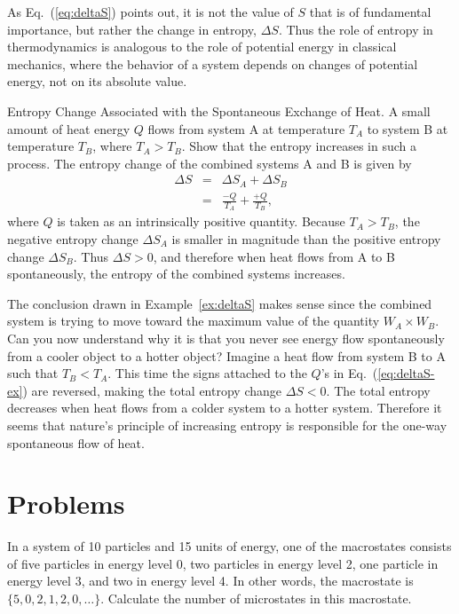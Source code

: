 As Eq.~(\ref{eq:deltaS}) points out, it is not the value of $S$ that
is of fundamental importance, but rather the change in entropy,
$\Delta S$.  Thus the role of entropy in thermodynamics is analogous
to the role of potential energy in classical mechanics, where the
behavior of a system depends on changes of potential energy, not on
its absolute value.

\begin{example}{Entropy Change Associated with the Spontaneous
    Exchange of Heat.}
\label{ex:deltaS}
A small amount of heat energy $Q$ flows from system A at temperature $T_A$
to system B at temperature $T_B$, where $T_A > T_B$.  Show that the 
entropy increases in such a process.
\solution
The entropy change of the combined systems A and B is given by
\begin{eqnarray}
\Delta S &=& \Delta S_A + \Delta S_B \nonumber \\
         &=& \frac{-Q}{T_A} + \frac{+Q}{T_B},
\label{eq:deltaS-ex}
\end{eqnarray}    
where $Q$ is taken as an intrinsically positive quantity.  Because
$T_A > T_B$, the negative entropy change $\Delta S_A$ is smaller in
magnitude than the positive entropy change $\Delta S_B$.  Thus $\Delta
S > 0$, and therefore when heat flows from A to B spontaneously, the
entropy of the combined systems increases.
\end{example}

The conclusion drawn in Example~\ref{ex:deltaS} makes sense since the
combined system is trying to move toward the maximum value of the
quantity $W_A\times W_B$.  Can you now understand why it is that you
never see energy flow spontaneously from a cooler object to a hotter
object?  Imagine a heat flow from system B to A such that $T_B < T_A$.
This time the signs attached to the $Q$'s in Eq.~(\ref{eq:deltaS-ex})
are reversed, making the total entropy change $\Delta S < 0$.  The
total entropy decreases when heat flows from a colder system to a
hotter system.  Therefore it seems that nature's principle of
increasing entropy is responsible for the one-way spontaneous flow of
heat.

\section*{Problems}

\begin{problem}
  In a system of 10 particles and 15 units of energy, one of the
  macrostates consists of five particles in energy level 0, two
  particles in energy level 2, one particle in energy level 3, and two
  in energy level 4.  In other words, the macrostate is $\{5, 0, 2, 1,
  2, 0, \dots\}$.  Calculate the number of microstates in this
  macrostate.
  \label{prob:micro-calc}
\end{problem}
 
